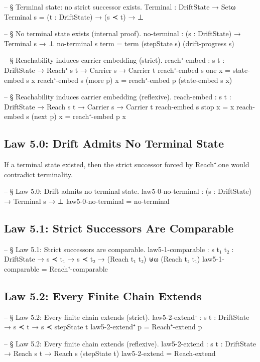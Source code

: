 \documentclass[11pt,a4paper]{book}
\def\texttt#1{#1}%
\begin{document}
\begin{code}
-- § Terminal state: no strict successor exists.
Terminal : DriftState → Setω
Terminal s = (t : DriftState) → (s ≺ t) → ⊥

-- § No terminal state exists (internal proof).
no-terminal : (s : DriftState) → Terminal s → ⊥
no-terminal s term = term (stepState s) (drift-progress s)

-- § Reachability induces carrier embedding (strict).
reach⁺-embed : {s t : DriftState} → Reach⁺ s t → Carrier s → Carrier t
reach⁺-embed {s} one      x = state-embed s x
reach⁺-embed {s} (more p) x = reach⁺-embed p (state-embed s x)

-- § Reachability induces carrier embedding (reflexive).
reach-embed : {s t : DriftState} → Reach s t → Carrier s → Carrier t
reach-embed {s} stop     x = x
reach-embed {s} (next p) x = reach⁺-embed p x
\end{code}

\subsection{Law 5.0: Drift Admits No Terminal State}

If a terminal state existed, then the strict successor forced by \texttt{Reach⁺.one} would contradict terminality.

\begin{code}
-- § Law 5.0: Drift admits no terminal state.
law5-0-no-terminal : (s : DriftState) → Terminal s → ⊥
law5-0-no-terminal = no-terminal
\end{code}

\subsection{Law 5.1: Strict Successors Are Comparable}

\begin{code}
-- § Law 5.1: Strict successors are comparable.
law5-1-comparable :
  {s t₁ t₂ : DriftState} →
  s ≺ t₁ →
  s ≺ t₂ →
  (Reach t₁ t₂) ⊎ω (Reach t₂ t₁)
law5-1-comparable = Reach⁺-comparable
\end{code}

\subsection{Law 5.2: Every Finite Chain Extends}

\begin{code}
-- § Law 5.2: Every finite chain extends (strict).
law5-2-extend⁺ :
  {s t : DriftState} →
  s ≺ t →
  s ≺ stepState t
law5-2-extend⁺ p = Reach⁺-extend p

-- § Law 5.2: Every finite chain extends (reflexive).
law5-2-extend :
  {s t : DriftState} →
  Reach s t →
  Reach s (stepState t)
law5-2-extend = Reach-extend
\end{code}
\end{document}
